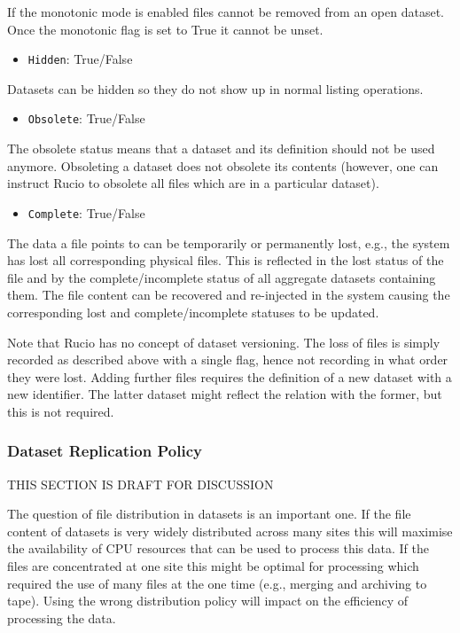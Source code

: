 \documentclass{atlasnote}
\newcommand{\code}[1]{\texttt{#1}}
\begin{document}
If the monotonic mode is enabled files cannot be removed from an open
dataset. Once the monotonic flag is set to True it cannot be unset.

\begin{itemize}
\item {} 
\code{Hidden}: True/False

\end{itemize}

Datasets can be hidden so they do not show up in normal listing operations.
\begin{itemize}
\item {} 
\code{Obsolete}: True/False

\end{itemize}

The obsolete status means that a dataset and its definition should not
be used anymore. Obsoleting a dataset does not obsolete its contents
(however, one can instruct Rucio to obsolete all files which are in a
particular dataset).

\begin{itemize}
\item {} 
\code{Complete}: True/False

\end{itemize}

The data a file points to can be temporarily or permanently lost,
e.g., the system has lost all corresponding physical files. This is
reflected in the lost status of the file and by the
complete/incomplete status of all aggregate datasets containing
them. The file content can be recovered and re-injected in the system
causing the corresponding lost and complete/incomplete statuses to be
updated.

Note that Rucio has no concept of dataset versioning. The loss of
files is simply recorded as described above with a single flag, hence
not recording in what order they were lost. Adding further files
requires the definition of a new dataset with a new identifier. The
latter dataset might reflect the relation with the former, but this is
not required.

\subsubsection{Dataset Replication Policy}
\label{sec:datas-repl-policy}

THIS SECTION IS DRAFT FOR DISCUSSION

The question of file distribution in datasets is an important one. If
the file content of datasets is very widely distributed across many
sites this will maximise the availability of CPU resources that can
be used to process this data. If the files are concentrated at one
site this might be optimal for processing which required the use of
many files at the one time (e.g., merging and archiving to
tape). Using the wrong distribution policy will impact on the
efficiency of processing the data.
\end{document}
